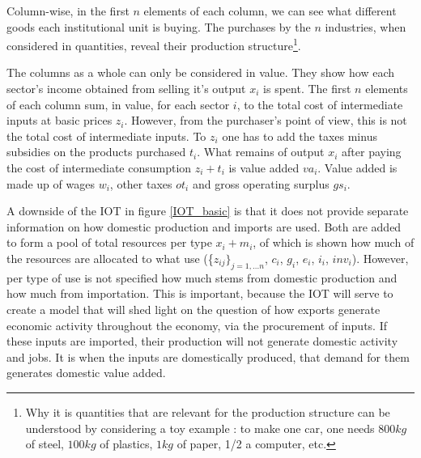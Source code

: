 \documentclass[12pt,english]{article}
\begin{document}
Column-wise, in the first $n$ elements of each column, we can see what different goods each institutional unit is buying. The purchases by the $n$ industries, when considered in quantities, reveal their production structure\footnote{Why it is quantities that are relevant for the production structure can be understood by considering a toy example : to make one car, one needs $800kg$ of steel, $100kg$ of plastics, $1kg$ of paper, 1/2 a computer, etc.}. 

The columns as a whole can only be considered in value. They show how each sector's income obtained from selling it's output $x_i$ is spent. %
The first $n$ elements of each column sum, in value, for each sector $i$, to the total cost of intermediate inputs at basic prices $z_i$. However, from the purchaser's point of view, this is not the total cost of intermediate inputs. To $z_i$ one has to add the taxes minus subsidies on the products purchased $t_i$. What remains of output $x_i$ after paying the cost of intermediate consumption $z_i + t_i$ is value added $va_i$. %
Value added is made up of wages $w_i$, other taxes $ot_i$ and gross operating surplus $gs_i$.

A downside of the IOT in figure \ref{IOT_basic} is that it does not provide separate information on how domestic production and imports are used. Both are added to form a pool of total resources per type $x_i + m_i$, of which is shown how much of the resources are allocated to what use (\{$z_{ij}\}_{j=1,\ldots n}$, $c_i$, $g_i$, $e_i$, $i_i$, $inv_i$). However, per type of use is not specified how much stems from domestic production and how much from importation. This is important, because the IOT will serve to create a model that will shed light on the question of how exports %
generate economic activity throughout the economy, via the procurement of inputs. If these inputs are imported, their production will not generate domestic activity and jobs. It is when the inputs are domestically produced, that demand for them generates domestic value added. 

\end{document}
